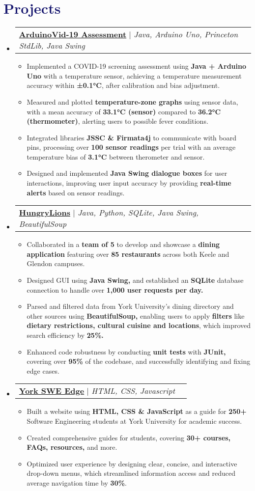 \documentclass[11pt]{extreport}
\makeatletter
\newcommand{\resumeItem}[1]{
  \item\small{
    {#1 \vspace{-2pt}}
  }
}
\newcommand{\resumeProjectHeading}[2]{
    \item
    \begin{tabular*}{0.97\textwidth}{l@{\extracolsep{\fill}}r}
      \small#1 & #2 \\
    \end{tabular*}\vspace{-7pt}
}
\newcommand{\resumeSubHeadingListStart}{\begin{itemize}[leftmargin=0.15in, label={}]}
\newcommand{\resumeSubHeadingListEnd}{\end{itemize}}
\newcommand{\resumeItemListStart}{\begin{itemize}}
\newcommand{\resumeItemListEnd}{\end{itemize}\vspace{-5pt}}
\makeatother
\begin{document}
\section{\textcolor{MidnightBlue}{Projects}}
    \resumeSubHeadingListStart
        \resumeProjectHeading
            {\textbf{{\underline{ArduinoVid-19 Assessment}}} $|$ \emph{Java, Arduino Uno, Princeton StdLib, Java Swing}}{}
            \resumeItemListStart
             \resumeItem{Implemented a COVID-19 screening assessment using \textbf{Java + Arduino Uno} with a temperature sensor, achieving a temperature measurement accuracy within \textbf{±0.1°C}, after calibration and bias adjustment.}
            \resumeItem{Measured and plotted \textbf{temperature-zone graphs} using sensor data, with a mean accuracy of \textbf{33.1°C (sensor)} compared to \textbf{36.2°C (thermometer)}, alerting users to possible fever conditions.}
            \resumeItem{Integrated libraries \textbf{JSSC \& Firmata4j} to communicate with board pins, processing over \textbf{100 sensor readings} per trial with an average temperature bias of \textbf{3.1°C} between therometer and sensor.}
            \resumeItem{Designed and implemented \textbf{Java Swing dialogue boxes} for user interactions, improving user input accuracy by providing \textbf{real-time alerts} based on sensor readings.}
            \resumeItemListEnd
        \resumeProjectHeading
            {\textbf{{\underline{HungryLions}}} $|$ \emph{Java, Python, SQLite, Java Swing, BeautifulSoup}}{}
            \resumeItemListStart 
                \resumeItem{Collaborated in a \textbf{team of 5} to develop and showcase a \textbf{dining application}  featuring over \textbf{85 restaurants} across both Keele and Glendon campuses.}
                \resumeItem{Designed GUI using \textbf{Java Swing,} and established an \textbf{SQLite} database connection to handle over \textbf{1,000 user requests per day.}}
                \resumeItem{Parsed and filtered data from York University's dining directory and other sources using \textbf{BeautifulSoup,} enabling users to apply \textbf{filters} like \textbf{dietary restrictions, 
                cultural cuisine and locations}, which improved search efficiency by \textbf{25\%.}}
                \resumeItem{Enhanced code robustness by conducting \textbf{unit tests} with \textbf{JUnit,} covering over \textbf{95\%} of the codebase, and successfully identifying and fixing edge cases.}
            \resumeItemListEnd
            \resumeProjectHeading
            {\textbf{{\underline{York SWE Edge}}} $|$ \emph{HTML, CSS, Javascript}}{}
            \resumeItemListStart
               \resumeItem{Built a website using \textbf{HTML, CSS \& JavaScript}
               as a guide for \textbf{250+} Software Engineering students at York University for academic success.}
               \resumeItem{Created comprehensive guides for students, covering \textbf{30+ courses, FAQs, resources,} and more.}
               \resumeItem{Optimized user experience  by designing clear, concise, and interactive drop-down menus, which streamlined information access and reduced average navigation time by \textbf{30\%}.}
            \resumeItemListEnd
    \resumeSubHeadingListEnd
\end{document}
